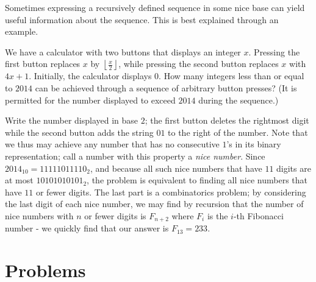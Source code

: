 \documentclass{article}
\begin{document}
Sometimes expressing a recursively defined sequence in some nice base can yield useful information about the sequence. This is best explained through an example. 

\begin{exam}
We have a calculator with two buttons that displays an integer $x$. Pressing the first button replaces $x$ by $\left\lfloor \frac x2\right\rfloor$, while pressing the second button replaces $x$ with $4x+1$. Initially, the calculator displays $0$. How many integers less than or equal to $2014$ can be achieved through a sequence of arbitrary button presses? (It is permitted for the number displayed to exceed $2014$ during the sequence.)
\end{exam}

\begin{sol}
Write the number displayed in base $2$; the first button deletes the rightmost digit while the second button adds the string $01$ to the right of the number. Note that we thus may achieve any number that has no consecutive $1$'s in its binary representation; call a number with this property a \textit{nice number}. Since $2014_{10}=11111011110_2$, and because all such nice numbers that have $11$ digits are at most $10101010101_2$, the problem is equivalent to finding all nice numbers that have $11$ or fewer digits. The last part is a combinatorics problem; by considering the last digit of each nice number, we may find by recursion that the number of nice numbers with $n$ or fewer digits is $F_{n+2}$ where $F_i$ is the $i$-th Fibonacci number - we quickly find that our answer is $F_{13}=233$. 
\end{sol}

\pagebreak

\section{Problems}





\end{document}
